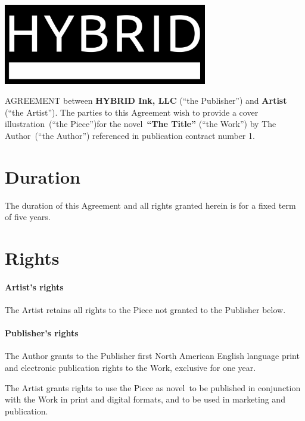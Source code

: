 \documentclass[12pt,letterpaper]{article}
\def\WorkTitle{The Title}
\def\WorkAuthor{The Author}
\def\WorkType{novel}
\def\Artist{Artist}
\def\ArtType{a cover illustration}
\def\RelatedContract{1}
\begin{document}
\begin{center}
\noindent\includegraphics[width=3.5in]{logo}
\end{center}

\vspace{0.5in}

\noindent AGREEMENT between \textbf{HYBRID Ink, LLC} (``the Publisher'') and \textbf{\Artist} (``the Artist''). The parties to this Agreement wish to provide \ArtType\ (``the Piece'')for the \WorkType\ \textbf{``\WorkTitle''} (``the Work'') by \WorkAuthor\ (``the Author'') referenced in publication contract number \RelatedContract.

\section{Duration}

The duration of this Agreement and all rights granted herein is for a fixed term of five years.

\section{Rights}

\paragraph{Artist's rights}

The Artist retains all rights to the Piece not granted to the Publisher below.

\paragraph{Publisher's rights}

The Author grants to the Publisher first North American English language print and electronic publication rights to the Work, exclusive for one year.

The Artist grants rights to use the Piece as \WorkType\ to be published in conjunction with the Work in print and digital formats, and to be used in marketing and publication.
\end{document}
